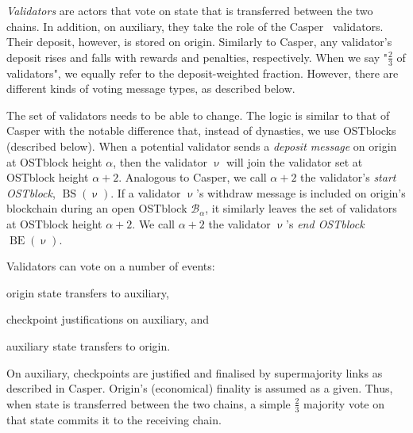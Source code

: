 \documentclass[12pt,a4paper]{article}
\newcommand{\B}{\mathcal{B}}
\newcommand{\BS}{\operatorname{BS}}
\newcommand{\BE}{\operatorname{BE}}
\begin{document}
\emph{Validators} are actors that vote on state that is transferred between the two chains.
In addition, on auxiliary, they take the role of the Casper~\cite{casperffg} validators.
Their deposit, however, is stored on origin.
Similarly to Casper, any validator's deposit rises and falls with rewards and penalties, respectively.
When we say "$\frac{2}{3}$ of validators", we equally refer to the deposit-weighted fraction.
However, there are different kinds of voting message types, as described below.

The set of validators needs to be able to change.
The logic is similar to that of Casper with the notable difference that, instead of dynasties, we use OSTblocks (described below).
When a potential validator sends a \emph{deposit message} on origin at OSTblock height $\alpha$,
then the validator $\upnu$ will join the validator set at OSTblock height $\alpha+2$.
Analogous to Casper, we call $\alpha+2$ the validator's \emph{start OSTblock}, $\BS(\upnu)$.
If a validator $\upnu$'s withdraw message is included on origin's blockchain during an open OSTblock $\B_\alpha$,
it similarly leaves the set of validators at OSTblock height $\alpha+2$.
We call $\alpha+2$ the validator $\upnu$'s \emph{end OSTblock} $\BE(\upnu)$.

Validators can vote on a number of events:
\begin{inparaenum}[(a)]
	\item origin state transfers to auxiliary,
	\item checkpoint justifications on auxiliary, and
 	\item auxiliary state transfers to origin.
\end{inparaenum}
On auxiliary, checkpoints are justified and finalised by supermajority links as described in Casper.
Origin's (economical) finality is assumed as a given.
Thus, when state is transferred between the two chains, a simple $\frac{2}{3}$ majority vote on that state commits it to the receiving chain.
\end{document}
